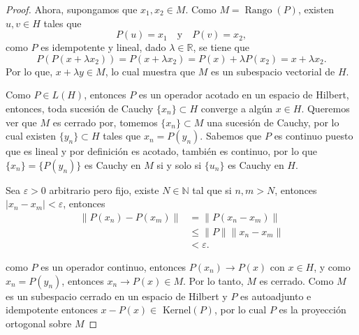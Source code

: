 \begin{itemize}
\begin{proof}
Ahora, supongamos que $x_1, x_2 \in M$. Como $M = \operatorname{Rango}(P)$, existen $u, v \in H$ tales que
\[
P(u) = x_1 \quad \text{y} \quad P(v) = x_2,
\]
como $P$ es idempotente y lineal, dado \( \lambda \in \mathbb{R} \), se tiene que 
\[
P(P(x + \lambda x_2))=P(x + \lambda x_2) = P(x) + \lambda P(x_2) = x + \lambda x_2.
\]
Por lo que, \( x + \lambda y \in M \), lo cual muestra que \( M \) es un subespacio vectorial de \( H \).

Como \( P \in L(H) \), entonces \( P \) es un operador acotado en un espacio de Hilbert, entonces, toda sucesión de Cauchy \( \{x_n\} \subset H \) converge a algún \( x \in H \). Queremos ver que \( M \) es cerrado por, tomemos \( \{x_n\} \subset M \) una sucesión de Cauchy, por lo cual existen \( \{y_n\} \subset H \) tales que \( x_n = P(y_n) \). Sabemos que \( P \) es continuo puesto que es lineal y por definición es acotado, también es continuo, por lo que \( \{x_n\} = \{P(y_n)\} \) es Cauchy en \( M \) si y solo si \( \{u_n\} \) es Cauchy en \( H \).


Sea \( \varepsilon > 0 \) arbitrario pero fijo, existe \( N \in \mathbb{N} \) tal que si \( n, m > N \), entonces $|x_n - x_m|<\varepsilon$, entonces
\begin{align*}
 \|P(x_n) - P(x_m)\| &= \|P(x_n - x_m)\|\\
 & \leq \|P\| \|x_n - x_m\|\\& < \varepsilon.   
\end{align*}

como \( P \) es un operador continuo, entonces \( P(x_n) \to P(x) \) con \( x \in H \), y como \( x_n = P(y_n) \), entonces \( x_n \to P(x) \in M \). Por lo tanto, \( M \) es cerrado. Como $M$ es un subespacio cerrado en un espacio de Hilbert y $P$ es autoadjunto e idempotente entonces $x-P(x)\in$ Kernel$(P)$, por lo cual $P$ es la proyección ortogonal sobre $M$

\end{proof}

 \end{itemize}







